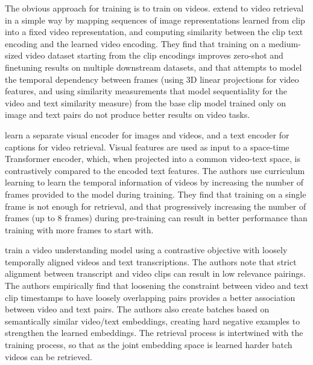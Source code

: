 The obvious approach for training  is to train on videos.
\citet{luo2022clip4clip} extend  to video retrieval in a simple
way by mapping sequences of image representations learned from \acrshort{clip}
into a fixed video representation, and computing similarity between the
\acrshort{clip} text encoding and the learned video encoding. They find that
training on a medium-sized video dataset starting from the \acrshort{clip}
encodings improves zero-shot and finetuning results on multiple downstream
datasets, and that attempts to model the temporal dependency between frames
(using 3D linear projections for video features, and using similarity
measurements that model sequentiality for the video and text similarity
measure) from the base \acrshort{clip} model trained only on image and text
pairs do not produce better results on video tasks.

\citet{bain2021frozen} learn a separate visual encoder for images and videos,
and a text encoder for captions for video retrieval. Visual features are used
as input to a space-time Transformer encoder, which, when projected into a
common video-text space, is contrastively compared to the encoded text
features. The authors use curriculum learning to learn the temporal information
of videos by increasing the number of frames provided to the model during
training. They find that training on a single frame is not enough for
retrieval, and that progressively increasing the number of frames (up to 8
frames) during pre-training can result in better performance than training with
more frames to start with. 

\citet{xu2021videoclip} train a video understanding model using a contrastive
objective with loosely temporally aligned videos and text transcriptions. The
authors note that strict alignment between transcript and video clips can
result in low relevance pairings. 
The authors
empirically find that loosening the constraint between video and text clip
timestamps to have loosely overlapping pairs provides a better association
between video and text pairs. The authors also create batches based on
semantically similar video/text embeddings, creating hard negative examples
to strengthen the learned embeddings. The retrieval process is intertwined
with the training process, so that as the joint embedding space is learned
harder batch videos can be retrieved.

